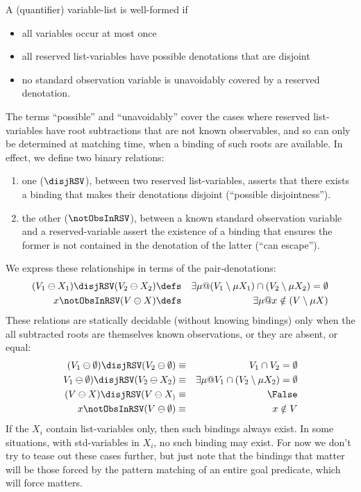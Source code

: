A (quantifier) variable-list is well-formed if
\begin{itemize}
  \item all variables occur at most once
  \item all reserved list-variables have possible denotations that are disjoint
  \item no standard observation variable is unavoidably covered by a reserved
    denotation.
\end{itemize}
The terms ``possible'' and ``unavoidably'' cover the cases where reserved
list-variables have root subtractions that are not known observables,
and so can only be determined at matching time, when a binding of such
roots are available.
In effect, we define two binary relations:
\begin{enumerate}
  \item
    one ($\disjRSV$), between two reserved list-variables,
    asserts that there exists a binding
    that makes their denotations disjoint (``possible disjointness'').
  \item the other ($\notObsInRSV$), between a known standard observation variable
  and a reserved-variable
   assert the existence of a binding that ensures the former is not contained in the denotation
   of the latter (``can escape'').
\end{enumerate}
We express these relationships in terms of the pair-denotations:
\begin{eqnarray*}
   (V_1\ominus X_1) \disjRSV (V_2\ominus X_2)
   &\defs&
   \exists \mu @ (V_1\setminus \mu X_1) \cap (V_2\setminus \mu X_2) = \emptyset
\\ x \notObsInRSV (V \ominus X)
   &\defs&
   \exists \mu @ x \notin (V \setminus \mu X)
\end{eqnarray*}
These relations are statically decidable (without knowing bindings)
only when the all subtracted roots are themselves known observations,
or they are absent, or equal:
\begin{eqnarray*}
   (V_1\ominus \emptyset) \disjRSV (V_2\ominus \emptyset)
   &\equiv&
   V_1 \cap V_2 = \emptyset
\\ V_1\ominus \emptyset) \disjRSV (V_2\ominus X_2)
   &\equiv&
   \exists \mu @ V_1 \cap (V_2\setminus \mu X_2) = \emptyset
\\ (V \ominus X) \disjRSV (V\ominus X_)
   &\equiv&
   \False
\\ x \notObsInRSV (V \ominus \emptyset)
   &\equiv&
   x \notin V
\end{eqnarray*}
If the $X_i$ contain list-variables only, then such bindings always exist.
In some situations, with std-variables in $X_i$, no such binding may exist.
For now we don't try to tease out these cases further, but just note that
the bindings that matter will be those forced by the pattern matching
of an entire goal predicate, which will force matters.

